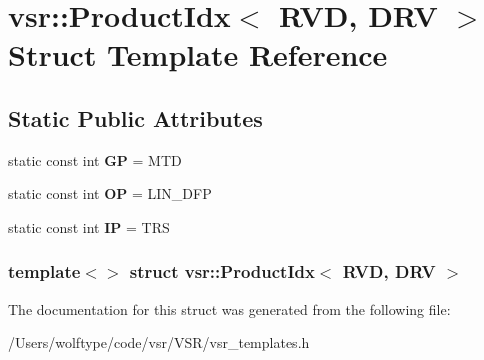 \hypertarget{structvsr_1_1_product_idx_3_01_r_v_d_00_01_d_r_v_01_4}{\section{vsr\-:\-:Product\-Idx$<$ R\-V\-D, D\-R\-V $>$ Struct Template Reference}
\label{structvsr_1_1_product_idx_3_01_r_v_d_00_01_d_r_v_01_4}
}
\subsection*{Static Public Attributes}
\begin{DoxyCompactItemize}
\item 
\hypertarget{structvsr_1_1_product_idx_3_01_r_v_d_00_01_d_r_v_01_4_aeedc2b05db26905807f32567fe4bf761}{static const int {\bfseries G\-P} = M\-T\-D}\label{structvsr_1_1_product_idx_3_01_r_v_d_00_01_d_r_v_01_4_aeedc2b05db26905807f32567fe4bf761}

\item 
\hypertarget{structvsr_1_1_product_idx_3_01_r_v_d_00_01_d_r_v_01_4_acb173f909a4dead32e5a0b2b35c37a8e}{static const int {\bfseries O\-P} = L\-I\-N\-\_\-\-D\-F\-P}\label{structvsr_1_1_product_idx_3_01_r_v_d_00_01_d_r_v_01_4_acb173f909a4dead32e5a0b2b35c37a8e}

\item 
\hypertarget{structvsr_1_1_product_idx_3_01_r_v_d_00_01_d_r_v_01_4_a77eec28eb159863e3c0e82b3ea4d5c4d}{static const int {\bfseries I\-P} = T\-R\-S}\label{structvsr_1_1_product_idx_3_01_r_v_d_00_01_d_r_v_01_4_a77eec28eb159863e3c0e82b3ea4d5c4d}

\end{DoxyCompactItemize}
\subsubsection*{template$<$$>$ struct vsr\-::\-Product\-Idx$<$ R\-V\-D, D\-R\-V $>$}



The documentation for this struct was generated from the following file\-:\begin{DoxyCompactItemize}
\item 
/\-Users/wolftype/code/vsr/\-V\-S\-R/vsr\-\_\-templates.\-h\end{DoxyCompactItemize}
